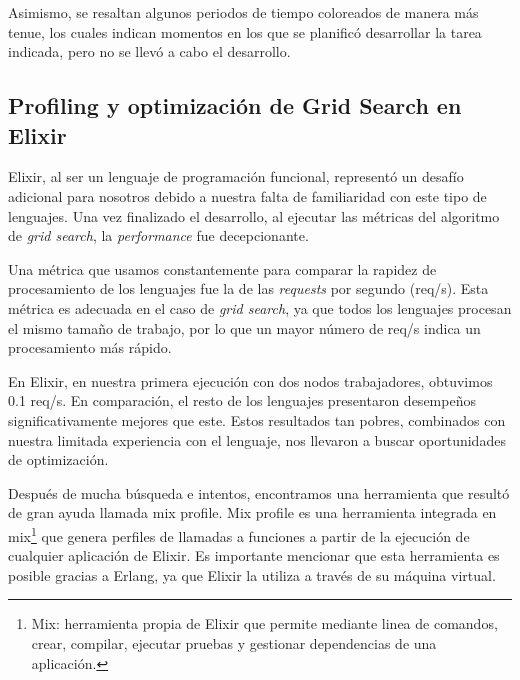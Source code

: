 \documentclass[11pt]{article}
\let\Oldsubsection\subsection
\renewcommand{\subsection}{\FloatBarrier\Oldsubsection}
\newcommand{\english}[1]{\textit{#1}}
\begin{document}
Asimismo, se resaltan algunos periodos de tiempo coloreados de manera más tenue, los cuales indican momentos en los que se planificó desarrollar la tarea indicada, pero no se llevó a cabo el desarrollo.

\subsection{Profiling y optimización de Grid Search en Elixir} \label{sec:anex:elixir_gs_optimization}


Elixir, al ser un lenguaje de programación funcional, representó un desafío adicional para nosotros debido a nuestra falta de familiaridad con este tipo de lenguajes. Una vez finalizado el desarrollo, al ejecutar las métricas del algoritmo de \english{grid search}, la \english{performance} fue decepcionante.

Una métrica que usamos constantemente para comparar la rapidez de procesamiento de los lenguajes fue la de las \english{requests} por segundo (req/s). Esta métrica es adecuada en el caso de \english{grid search}, ya que todos los lenguajes procesan el mismo tamaño de trabajo, por lo que un mayor número de req/s indica un procesamiento más rápido.

En Elixir, en nuestra primera ejecución con dos nodos trabajadores, obtuvimos 0.1 req/s. En comparación, el resto de los lenguajes presentaron desempeños significativamente mejores que este. Estos resultados tan pobres, combinados con nuestra limitada experiencia con el lenguaje, nos llevaron a buscar oportunidades de optimización.

Después de mucha búsqueda e intentos, encontramos una herramienta que resultó de gran ayuda llamada mix profile. Mix profile es una herramienta integrada en mix\footnote{Mix: herramienta propia de Elixir que permite mediante linea de comandos, crear, compilar, ejecutar pruebas y gestionar dependencias de una aplicación.} que genera perfiles de llamadas a funciones a partir de la ejecución de cualquier aplicación de Elixir. Es importante mencionar que esta herramienta es posible gracias a Erlang, ya que Elixir la utiliza a través de su máquina virtual.
\end{document}
